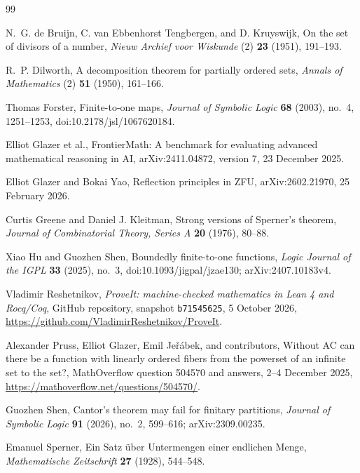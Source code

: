 \documentclass[11pt,letterpaper]{article}
\numberwithin{equation}{section}
\theoremstyle{plain}
\theoremstyle{definition}
\theoremstyle{remark}
\begin{document}
\begin{thebibliography}{99}

N.~G. de Bruijn, C. van Ebbenhorst Tengbergen, and D. Kruyswijk,
\newblock On the set of divisors of a number,
\newblock \emph{Nieuw Archief voor Wiskunde} (2) \textbf{23} (1951), 191--193.

R.~P. Dilworth,
\newblock A decomposition theorem for partially ordered sets,
\newblock \emph{Annals of Mathematics} (2) \textbf{51} (1950), 161--166.

Thomas Forster,
\newblock Finite-to-one maps,
\newblock \emph{Journal of Symbolic Logic} \textbf{68} (2003), no.~4,
1251--1253, doi:10.2178/jsl/1067620184.

Elliot Glazer et al.,
\newblock FrontierMath: A benchmark for evaluating advanced mathematical reasoning in AI,
\newblock arXiv:2411.04872, version 7, 23 December 2025.

Elliot Glazer and Bokai Yao,
\newblock Reflection principles in ZFU,
\newblock arXiv:2602.21970, 25 February 2026.

Curtis Greene and Daniel J. Kleitman,
\newblock Strong versions of Sperner's theorem,
\newblock \emph{Journal of Combinatorial Theory, Series A} \textbf{20}
(1976), 80--88.

Xiao Hu and Guozhen Shen,
\newblock Boundedly finite-to-one functions,
\newblock \emph{Logic Journal of the IGPL} \textbf{33} (2025), no.~3,
doi:10.1093/jigpal/jzae130; arXiv:2407.10183v4.

Vladimir Reshetnikov,
\newblock \emph{ProveIt: machine-checked mathematics in Lean 4 and Rocq/Coq},
\newblock GitHub repository, snapshot
\texttt{b71545625}, 5 October 2026,
\url{https://github.com/VladimirReshetnikov/ProveIt}.

Alexander Pruss, Elliot Glazer, Emil Je\v{r}\'abek, and contributors,
\newblock Without AC can there be a function with linearly ordered fibers from the powerset of an infinite set to the set?,
\newblock MathOverflow question 504570 and answers, 2--4 December 2025,
\url{https://mathoverflow.net/questions/504570/}.

Guozhen Shen,
\newblock Cantor's theorem may fail for finitary partitions,
\newblock \emph{Journal of Symbolic Logic} \textbf{91} (2026), no.~2,
599--616; arXiv:2309.00235.

Emanuel Sperner,
\newblock Ein Satz \"uber Untermengen einer endlichen Menge,
\newblock \emph{Mathematische Zeitschrift} \textbf{27} (1928), 544--548.

\end{thebibliography}
\end{document}
